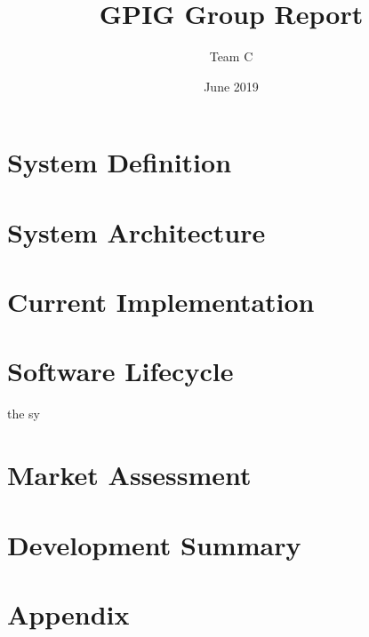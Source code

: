 \documentclass{UoYCSproject}
\title{GPIG Group Report}
\author{Team C}
\date{June 2019}
\begin{document}
\maketitle
{}
\chapter{System Definition} \label{systemdef}


\chapter{System Architecture} \label{systemarch}


\chapter{Current Implementation} \label{currentimp}


\chapter{Software Lifecycle} \label{softwarelife}
the sy

\chapter{Market Assessment} \label{market}


\chapter{Development Summary} \label{devsummary}


\appendix
\chapter{Appendix}




\printbibliography
\end{document}
